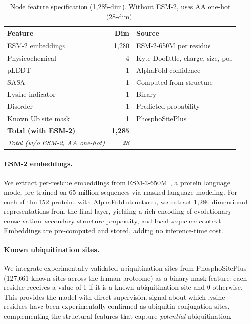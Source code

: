 \documentclass[sigconf]{acmart}
\begin{document}
\begin{table}[!ht]
\centering
\caption{Node feature specification (1,285-dim). Without ESM-2, uses AA one-hot (28-dim).}
\label{tab:nodefeats_main}
\scriptsize
\setlength{\tabcolsep}{2pt}
\begin{tabular}{@{}lrl@{}}
\toprule
\textbf{Feature} & \textbf{Dim} & \textbf{Source} \\
\midrule
ESM-2 embeddings & 1,280 & ESM-2-650M per residue \\
Physicochemical & 4 & Kyte-Doolittle, charge, size, pol. \\
pLDDT & 1 & AlphaFold confidence \\
SASA & 1 & Computed from structure \\
Lysine indicator & 1 & Binary \\
Disorder & 1 & Predicted probability \\
Known Ub site mask & 1 & PhosphoSitePlus \\
\midrule
\textbf{Total (with ESM-2)} & \textbf{1,285} & \\
\textit{Total (w/o ESM-2, AA one-hot)} & \textit{28} & \\
\bottomrule
\end{tabular}
\end{table}

\paragraph{ESM-2 embeddings.}
We extract per-residue embeddings from ESM-2-650M~\cite{lin2023esm2}, a protein language model pre-trained on 65 million sequences via masked language modeling.
For each of the 152 proteins with AlphaFold structures, we extract 1,280-dimensional representations from the final layer, yielding a rich encoding of evolutionary conservation, secondary structure propensity, and local sequence context.
Embeddings are pre-computed and stored, adding no inference-time cost.

\paragraph{Known ubiquitination sites.}
We integrate experimentally validated ubiquitination sites from PhosphoSitePlus (127,661 known sites across the human proteome) as a binary mask feature: each residue receives a value of 1 if it is a known ubiquitination site and 0 otherwise.
This provides the model with direct supervision signal about which lysine residues have been experimentally confirmed as ubiquitin conjugation sites, complementing the structural features that capture \emph{potential} ubiquitination.
\end{document}
